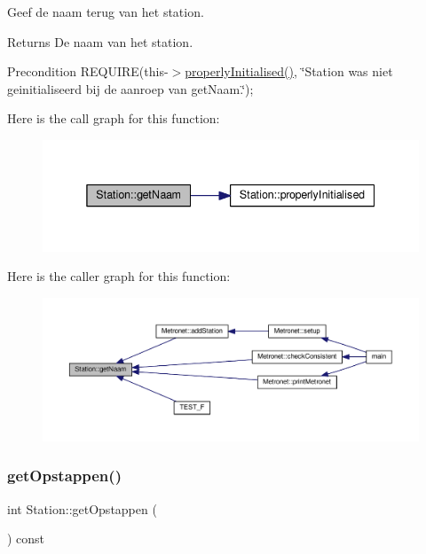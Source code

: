 Geef de naam terug van het station. 

\begin{DoxyReturn}{Returns}
De naam van het station. 
\end{DoxyReturn}
\begin{DoxyPrecond}{Precondition}
R\+E\+Q\+U\+I\+RE(this-\/$>$\hyperlink{class_station_a9ce626dd0599e3ea8107404a59c21e16}{properly\+Initialised()}, \char`\"{}\+Station was niet geinitialiseerd bij de aanroep van get\+Naam.\char`\"{}); 
\end{DoxyPrecond}
Here is the call graph for this function\+:\nopagebreak
\begin{figure}[H]
\begin{center}
\leavevmode
\includegraphics[width=338pt]{class_station_aea6c31c39a5e1eb4c30337e7ce489e69_cgraph}
\end{center}
\end{figure}
Here is the caller graph for this function\+:\nopagebreak
\begin{figure}[H]
\begin{center}
\leavevmode
\includegraphics[width=350pt]{class_station_aea6c31c39a5e1eb4c30337e7ce489e69_icgraph}
\end{center}
\end{figure}
\mbox{\label{class_station_a5897f83319093d502f01f18b24678aba}} 
\subsubsection{\texorpdfstring{get\+Opstappen()}{getOpstappen()}}
{\footnotesize\ttfamily int Station\+::get\+Opstappen (\begin{DoxyParamCaption}{ }\end{DoxyParamCaption}) const}



